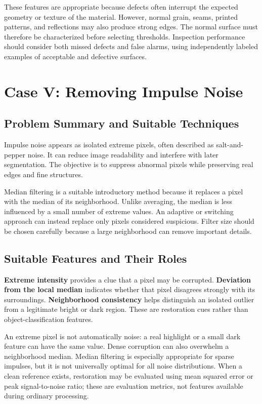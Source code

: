 \documentclass[conference]{IEEEtran}
\begin{document}
These features are appropriate because defects often interrupt the expected geometry or texture of the material. However, normal grain, seams, printed patterns, and reflections may also produce strong edges. The normal surface must therefore be characterized before selecting thresholds. Inspection performance should consider both missed defects and false alarms, using independently labeled examples of acceptable and defective surfaces.

\section{Case V: Removing Impulse Noise}
\subsection{Problem Summary and Suitable Techniques}
Impulse noise appears as isolated extreme pixels, often described as salt-and-pepper noise. It can reduce image readability and interfere with later segmentation. The objective is to suppress abnormal pixels while preserving real edges and fine structures.

Median filtering is a suitable introductory method because it replaces a pixel with the median of its neighborhood. Unlike averaging, the median is less influenced by a small number of extreme values. An adaptive or switching approach can instead replace only pixels considered suspicious. Filter size should be chosen carefully because a large neighborhood can remove important details.

\subsection{Suitable Features and Their Roles}
\textbf{Extreme intensity} provides a clue that a pixel may be corrupted. \textbf{Deviation from the local median} indicates whether that pixel disagrees strongly with its surroundings. \textbf{Neighborhood consistency} helps distinguish an isolated outlier from a legitimate bright or dark region. These are restoration cues rather than object-classification features.

An extreme pixel is not automatically noise: a real highlight or a small dark feature can have the same value. Dense corruption can also overwhelm a neighborhood median. Median filtering is especially appropriate for sparse impulses, but it is not universally optimal for all noise distributions. When a clean reference exists, restoration may be evaluated using mean squared error or peak signal-to-noise ratio; these are evaluation metrics, not features available during ordinary processing.
\end{document}
